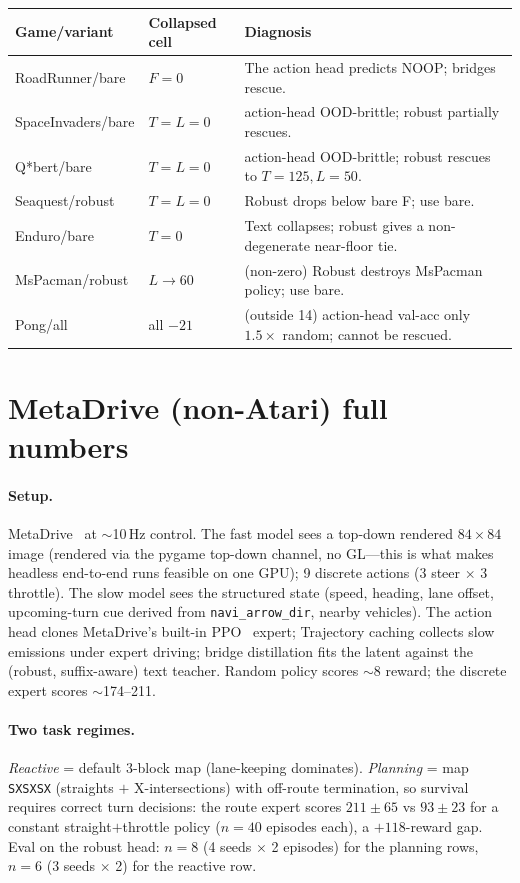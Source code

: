 \documentclass[11pt]{article}
\begin{document}
\smallskip\noindent
{\small\setlength{\tabcolsep}{4pt}
\begin{tabular}{ll p{6.6cm}}
\toprule
Game/variant & Collapsed cell & Diagnosis \\
\midrule
RoadRunner/bare & $F=0$ & The action head predicts NOOP; bridges rescue. \\
SpaceInvaders/bare & $T=L=0$ & action-head OOD-brittle; robust partially rescues. \\
Q*bert/bare & $T=L=0$ & action-head OOD-brittle; robust rescues to $T\!=\!125, L\!=\!50$. \\
Seaquest/robust & $T=L=0$ & Robust drops below bare F; use bare. \\
Enduro/bare & $T=0$ & Text collapses; robust gives a non-degenerate near-floor tie. \\
\midrule
MsPacman/robust & $L\!\to\!60$ & (non-zero) Robust destroys MsPacman policy; use bare. \\
Pong/all & all $-21$ & (outside 14) action-head val-acc only $1.5\times$ random; cannot be rescued. \\
\bottomrule
\end{tabular}}

\section{MetaDrive (non-Atari) full numbers}
\label{app:metadrive}

\paragraph{Setup.} MetaDrive~\cite{metadrive} at $\sim$10\,Hz control. The fast model sees a
top-down rendered $84\!\times\!84$ image (rendered via the pygame top-down channel, no GL---this
is what makes headless end-to-end runs feasible on one GPU); 9 discrete actions (3 steer
$\times$ 3 throttle). The slow model sees the structured state (speed, heading, lane offset,
upcoming-turn cue derived from \texttt{navi\_arrow\_dir}, nearby vehicles). The action head clones
MetaDrive's built-in PPO~\cite{ppo} expert; Trajectory caching collects slow emissions under expert driving; bridge distillation
fits the latent against the (robust, suffix-aware) text teacher. Random policy scores
$\sim$8 reward; the discrete expert scores $\sim$174--211.

\paragraph{Two task regimes.} \emph{Reactive} = default 3-block map (lane-keeping dominates).
\emph{Planning} = map \texttt{SXSXSX} (straights $+$ X-intersections) with off-route termination,
so survival requires correct turn decisions: the route expert scores $211\pm65$ vs $93\pm23$ for
a constant straight$+$throttle policy ($n\!=\!40$ episodes each), a $+118$-reward gap. Eval on the robust head: $n\!=\!8$ (4 seeds $\times$ 2 episodes) for the planning
rows, $n\!=\!6$ (3 seeds $\times$ 2) for the reactive row.
\end{document}
